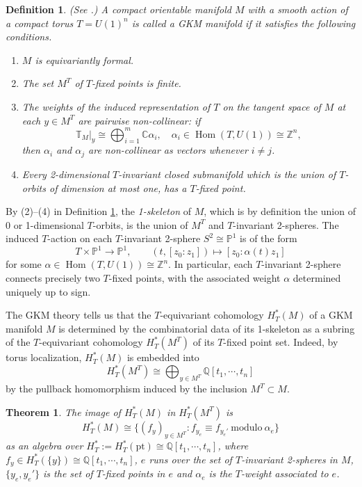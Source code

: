 \documentclass[11pt]{article}
\newtheorem{definition}[theo]{Definition}
\newtheorem{theorem}[theo]{Theorem}
\theoremstyle{definition}
\numberwithin{equation}{section}
\numberwithin{equation}{section}
\newcommand{\C}{\mathbb{C}}
\newcommand{\PP}{\mathbb{P}}
\newcommand\QQ{\mathbb{Q}}
\newcommand\ZZ{\mathbb{Z}}
\DeclareMathOperator{\Hom}{Hom}
\newcommand\lra{\longrightarrow }
\begin{document}
\begin{definition}\label{n9}
(See \cite[Definition 5.1]{AB}.)
A compact orientable manifold $M$ with a smooth action of a compact torus $T=U(1)^n$ is called a \emph{GKM manifold} if it satisfies the following conditions. 
	\begin{enumerate}
		\item $M$ is equivariantly formal.
		\item The set $M^T$ of $T$-fixed points is finite.
		\item The weights of the induced representation of $T$ on the tangent space of $M$ at each $y\in M^T$ are pairwise non-collinear: if
		\[\mathbb{T}_M|_y \cong \bigoplus_{i=1}^m \C \alpha_i, \quad \alpha_i\in \Hom (T,U(1))\cong \ZZ^n, \]
			then $\alpha_i$ and $\alpha_j$ are non-collinear as vectors %
			whenever $i\neq j$.
		\item Every 2-dimensional $T$-invariant closed submanifold which is the union of $T$-orbits of dimension at most one, has a $T$-fixed point. 
	\end{enumerate}
\end{definition}
By (2)--(4) in Definition \ref{n9}, the \emph{1-skeleton} of $M$, which is by definition the union of 0 or 1-dimensional $T$-orbits, is the union of $M^T$ and $T$-invariant 2-spheres. The induced $T$-action on each $T$-invariant 2-sphere $S^2\cong \PP^1$ is of the form
\[T\times \PP^1\lra \PP^1, \qquad (t,[z_0:z_1])\mapsto [z_0:\alpha(t)z_1]\]
for some $\alpha\in \Hom(T,U(1))\cong \ZZ^n$. In particular, each $T$-invariant 2-sphere connects precisely two $T$-fixed points, with the associated weight $\alpha$ determined uniquely up to sign.

The GKM theory \cite{GKM, Kur} tells us that the $T$-equivariant cohomology $H^*_T(M)$ of a GKM manifold $M$ is determined by the combinatorial data of its 1-skeleton as a subring of the $T$-equivariant cohomology $H^*_T(M^T)$ of its 
$T$-fixed point set. 
Indeed, by torus localization, 
$H^*_T(M)$ is embedded into 
\[H^*_T(M^T) 
\cong \bigoplus_{y\in M^T}\QQ[t_1,\cdots, t_n]\] 
by the pullback homomorphism induced by the inclusion $M^T\subset M$.
\begin{theorem} 
\cite[Theorem 5.2]{AB} \label{35} 
The image of $H^*_T(M)$ in $H^*_T(M^T)$ is 
	\[H^*_T(M)\cong \{(f_y)_{y\in M^T}: f_{y_e}\equiv f_{y_e'} \mathrm{~modulo~}\alpha_e\}\]
	as an algebra over $H^*_T:=H^*_T(\mathrm{pt})\cong \QQ[t_1,\cdots,t_n]$, where $f_y\in H^*_T(\{y\})\cong \QQ[t_1,\cdots,t_n]$, $e$ runs over the set of $T$-invariant 2-spheres in $M$, $\{y_e,y_e'\}$ is the set of $T$-fixed points in $e$ and $\alpha_e$ is the $T$-weight associated to $e$.
\end{theorem}
\end{document}
